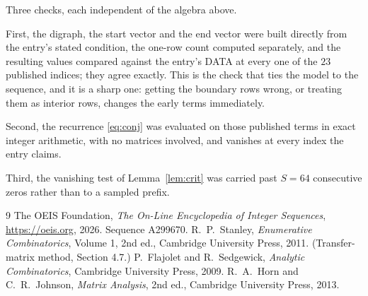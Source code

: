 \documentclass[11pt,a4paper]{article}
\theoremstyle{plain}
\theoremstyle{definition}
\begin{document}
Three checks, each independent of the algebra above.

First, the digraph, the start vector and the end vector were built directly from the
entry's stated condition, the one-row count computed separately, and the resulting values
compared against the entry's DATA at every one of the $23$ published indices; they
agree exactly. This is the check that ties the model to the sequence, and it is a sharp one:
getting the boundary rows wrong, or treating them as interior rows, changes the early terms
immediately.

Second, the recurrence \eqref{eq:conj} was evaluated on those published terms in exact
integer arithmetic, with no matrices involved, and vanishes at every index the entry claims.

Third, the vanishing test of Lemma~\ref{lem:crit} was carried past $S=64$ consecutive
zeros rather than to a sampled prefix.

\begin{thebibliography}{9}
 The OEIS Foundation, \emph{The On-Line Encyclopedia of Integer
Sequences}, \url{https://oeis.org}, 2026. Sequence A299670.
 R.~P.~Stanley, \emph{Enumerative Combinatorics}, Volume 1, 2nd ed.,
Cambridge University Press, 2011. (Transfer-matrix method, Section 4.7.)
 P.~Flajolet and R.~Sedgewick, \emph{Analytic Combinatorics}, Cambridge
University Press, 2009.
 R.~A.~Horn and C.~R.~Johnson, \emph{Matrix Analysis}, 2nd ed., Cambridge
University Press, 2013.
\end{thebibliography}
\end{document}

